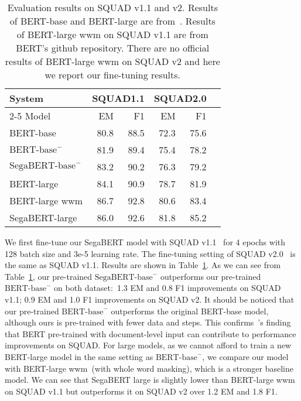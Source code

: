 \documentclass[letterpaper]{article}
\begin{document}
\begin{table}[t]\centering
  \small
  \begin{tabular}{lrrrrr}\toprule
  \multirow{2}{*}{System} &\multicolumn{2}{c}{SQUAD1.1} &\multicolumn{2}{c}{SQUAD2.0} \\\cmidrule{2-5}
  Model&EM &F1 &EM &F1 \\\midrule
  BERT-base &80.8 &88.5 &72.3 &75.6 \\
  $\text{BERT-base}^{-}$ &81.9 &89.4 &75.4 &78.2 \\
  $\text{SegaBERT-base}^{-}$ &83.2 &90.2 &76.3 &79.2 \\
  BERT-large &84.1 &90.9 &78.7 &81.9 \\
  BERT-large wwm &86.7 &92.8 &80.6 &83.4 \\
  SegaBERT-large &86.0 &92.6 &81.8 &85.2 \\
  \bottomrule
  \end{tabular}
  \caption{Evaluation results on SQUAD v1.1 and v2. Results of BERT-base and BERT-large are from~\citet{DBLP:journals/corr/bert}. Results of BERT-large wwm on SQUAD v1.1 are from BERT's github repository. There are no official results of BERT-large wwm on SQUAD v2 and here we report our fine-tuning results.}

  \label{tab: squad}
  \end{table} 
We first fine-tune our SegaBERT model with SQUAD v1.1~\cite{DBLP:conf/emnlp/squad11} for 4 epochs with 128 batch size and 3e-5 learning rate. The fine-tuning setting of SQUAD v2.0~\cite{DBLP:conf/acl/squad2} is the same as SQUAD v1.1. Results are shown in Table~\ref{tab: squad}. 
As we can see from Table~\ref{tab: squad}, our pre-trained $\text{SegaBERT-base}^{-}$ outperforms our pre-trained $\text{BERT-base}^{-}$ on both dataset:\ 1.3 EM and 0.8 F1 improvements on SQUAD v1.1; 0.9 EM and 1.0 F1 improvements on SQUAD v2. 
It should be noticed that our pre-trained $\text{BERT-base}^{-}$ outperforms the original BERT-base model, although ours is pre-trained with fewer data and steps. 
This confirms~\citet{DBLP:journals/corr/abs-1907-11692}'s finding that BERT pre-trained with document-level input can contribute to performance improvements on SQUAD.
For large models, as we cannot afford to train a new BERT-large model in the same setting as $\text{BERT-base}^{-}$, we compare our model with BERT-large wwm~(with whole word masking), which is a stronger baseline model.
We can see that SegaBERT large is slightly lower than BERT-large wwm on SQUAD v1.1 but outperforms it on SQUAD v2 over 1.2 EM and 1.8 F1.
\end{document}
